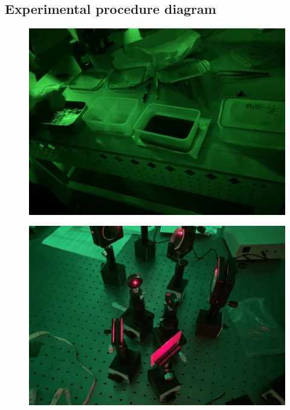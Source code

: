 \documentclass[UTF8]{article}
\begin{document}
\begin{appendix}
\section{Experimental procedure diagram}
	\begin{figure}[H]
           	    	\centering
           	    	\includegraphics[clip,scale=0.75,trim={0 0 0 0}]{fig/fig9.png}
           	        \label{figure.14}
               \end{figure}

       	\begin{figure}[H]
           	    	\centering
           	    	\includegraphics[clip,scale=0.75,trim={0 0 0 0}]{fig/fig10.png}
           	        \label{figure.14}
               \end{figure}
 \end{appendix}        
\end{document}
